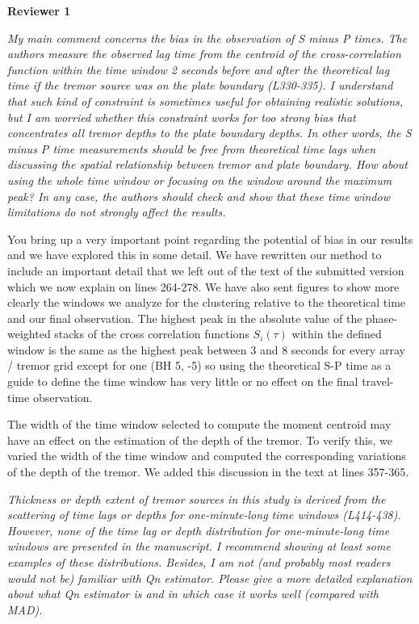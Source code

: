 \documentclass[letterpaper, 12pt]{article}
\begin{document}
\textbf{Reviewer 1}

\bigskip

\textit{My main comment concerns the bias in the observation of S minus P times. The authors measure the observed lag time from the centroid of the cross-correlation function within the time window 2 seconds before and after the theoretical lag time if the tremor source was on the plate boundary (L330-335). I understand that such kind of constraint is sometimes useful for obtaining realistic solutions, but I am worried whether this constraint works for too strong bias that concentrates all tremor depths to the plate boundary depths. In other words, the S minus P time measurements should be free from theoretical time lags when discussing the spatial relationship between tremor and plate boundary. How about using the whole time window or focusing on the window around the maximum peak? In any case, the authors should check and show that these time window limitations do not strongly affect the results.}

\bigskip

You bring up a very important point regarding the potential of bias in our results and we have explored this in some detail.  We have rewritten our method to include an important detail that we left out of the text of the submitted version which we now explain on lines 264-278.  We have also sent figures to show more clearly the windows we analyze for the clustering relative to the theoretical time and our final observation.  The highest peak in the absolute value of the phase-weighted stacks of the cross correlation functions $S_i (\tau)$ within the defined window is the same as the highest peak between 3 and  8 seconds for every array / tremor grid  except for one (BH 5, -5) so using the theoretical S-P time as a guide to define the time window has very little or no effect on the final travel-time observation.

\smallskip

The width of the time window selected to compute the moment centroid may have an effect on the estimation of the depth of the tremor. To verify this, we varied the width of the time window and computed the corresponding variations of the depth of the tremor. We added this discussion in the text at lines 357-365.

\bigskip

\textit{Thickness or depth extent of tremor sources in this study is derived from the scattering of time lags or depths for one-minute-long time windows (L414-438). However, none of the time lag or depth distribution for one-minute-long time windows are presented in the manuscript. I recommend showing at least some examples of these distributions. Besides, I am not (and probably most readers would not be) familiar with Qn estimator. Please give a more detailed explanation about what Qn estimator is and in which case it works well (compared with MAD).}
\end{document}
